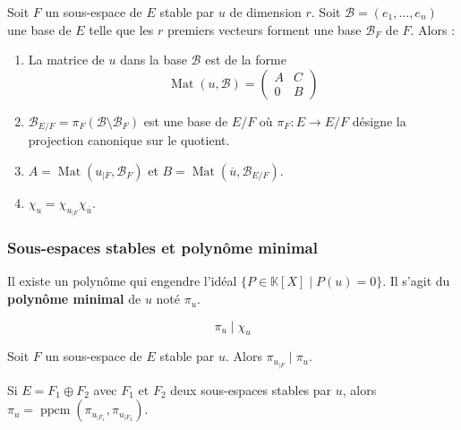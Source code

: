 
  \begin{proposition}
    Soit $F$ un sous-espace de $E$ stable par $u$ de dimension $r$. Soit $\mathcal{B} = (e_1, \dots, e_n)$ une base de $E$ telle que les $r$ premiers vecteurs forment une base $\mathcal{B}_F$ de $F$. Alors :
    \begin{enumerate}[label={\bfseries(\roman*)}]
      \item La matrice de $u$ dans la base $\mathcal{B}$ est de la forme
      \[ \operatorname{Mat}(u, \mathcal{B}) = \begin{pmatrix} A & C \\ 0 & B \end{pmatrix} \]
      \item $\mathcal{B}_{E/F} = \pi_F(\mathcal{B} \setminus \mathcal{B}_F)$ est une base de $E/F$ où $\pi_F : E \rightarrow E/F$ désigne la projection canonique sur le quotient.
      \item $A = \operatorname{Mat}(u_{|F}, \mathcal{B}_F)$ et $B = \operatorname{Mat}(\overline{u}, \mathcal{B}_{E/F})$.
      \item $\chi_u = \chi_{u_{|F}} \chi_{\overline{u}}$.
    \end{enumerate}
  \end{proposition}

  \subsubsection{Sous-espaces stables et polynôme minimal}


  \begin{proposition}
    Il existe un polynôme qui engendre l'idéal $\{ P \in \mathbb{K}[X] \mid P(u) = 0 \}$. Il s'agit du \textbf{polynôme minimal} de $u$ noté $\pi_u$.
  \end{proposition}

  \begin{theorem}
    \[ \pi_u \mid \chi_u \]
  \end{theorem}

  \begin{proposition}
    Soit $F$ un sous-espace de $E$ stable par $u$. Alors $\pi_{u_{|F}} \mid \pi_u$.
  \end{proposition}

  \begin{proposition}
    Si $E = F_1 \oplus F_2$ avec $F_1$ et $F_2$ deux sous-espaces stables par $u$, alors $\pi_u = \operatorname{ppcm}(\pi_{u_{|F_1}}, \pi_{u_{|F_2}})$.
  \end{proposition}

